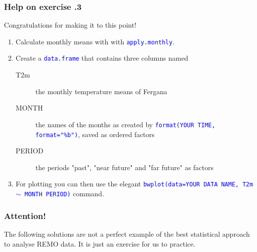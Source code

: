 \documentclass[xcolor=table, xcolor=dvipsnames]{beamer}\usepackage[]{graphicx}\usepackage[]{color}
\makeatletter
\newcommand{\hlnum}[1]{\textcolor[rgb]{0,0,0}{#1}}
\newcommand{\hlstr}[1]{\textcolor[rgb]{0.545,0.137,0.137}{#1}}
\newcommand{\hlcom}[1]{\textcolor[rgb]{0,0.392,0}{\textit{#1}}}
\newcommand{\hlstd}[1]{\textcolor[rgb]{0,0,0}{#1}}
\newcommand{\hlkwb}[1]{\textcolor[rgb]{0,0,0}{#1}}
\newcommand{\hlkwc}[1]{\textcolor[rgb]{1,0,1}{#1}}
\newcommand{\hlkwd}[1]{\textcolor[rgb]{0,0,1}{#1}}
\newenvironment{kframe}{%
 \def\at@end@of@kframe{}%
 \ifinner\ifhmode%
  \def\at@end@of@kframe{\end{minipage}}%
  \begin{minipage}{\columnwidth}%
 \fi\fi%
 \def\FrameCommand##1{\hskip\@totalleftmargin \hskip-\fboxsep
 \colorbox{shadecolor}{##1}\hskip-\fboxsep
     \hskip-\linewidth \hskip-\@totalleftmargin \hskip\columnwidth}%
 \MakeFramed {\advance\hsize-\width
   \@totalleftmargin\z@ \linewidth\hsize
   \@setminipage}}%
 {\par\unskip\endMakeFramed%
 \at@end@of@kframe}
\newenvironment{knitrout}{}{} %
\newcounter{exercisecount}
\newcommand{\rcode}[1]{\texttt{\textcolor{Blue}{#1}}} %
\makeatother
\begin{document}

\begin{frame}[fragile]\frametitle{Help on exercise .3}
Congratulations for making it to this point!
\begin{enumerate}
\item Calculate monthly means with with \rcode{apply.monthly}.
\item Create a \rcode{data.frame} that contains three columns named
\begin{description}
\item[T2m] {the monthly temperature means of Fergana}
\item[MONTH] {the names of the months as created by \rcode{format(YOUR TIME, format="\%b")}, saved as ordered factors}
\item[PERIOD] {the periods "past", "near future" and "far future" as factors}
\end{description}
\item For plotting you can then use the elegant \rcode{bwplot(data=YOUR DATA NAME, T2m $\sim$  MONTH \textbar PERIOD)} command.
\end{enumerate}
\end{frame}


\begin{frame}[fragile]\frametitle{Attention!}
The following solutions are not a perfect example of the best statistical approach to analyse REMO data. It is just an exercise for us to practice.
\end{frame}


\end{document}
